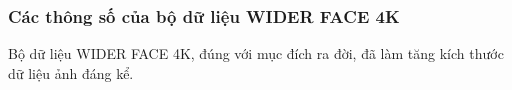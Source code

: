 {    \subsubsection*{Các thông số của bộ dữ liệu WIDER FACE 4K}
    Bộ dữ liệu WIDER FACE 4K, đúng với mục đích ra đời, đã làm tăng kích thước dữ liệu ảnh đáng kể.

    \begin{figure}[H]
        \centering

\end{figure}}
